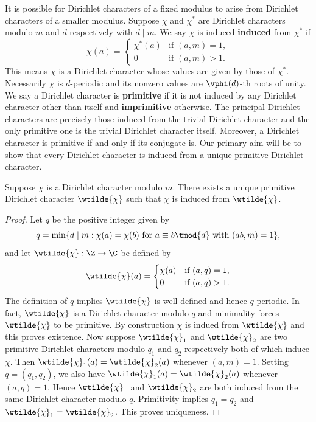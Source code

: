 \documentclass[12pt]{article}
\begin{document}
      It is possible for Dirichlet characters of a fixed modulus to arise from Dirichlet characters of a smaller modulus. Suppose \(\chi\) and \(\chi^{\ast}\) are Dirichlet characters modulo \(m\) and \(d\) respectively with \(d \mid m\). We say \(\chi\) is induced \textbf{induced} from \(\chi^{\ast}\) if
      \[
        \chi(a) = \begin{cases} \chi^{\ast}(a) & \text{if \((a,m) = 1\)}, \\ 0 & \text{if \((a,m) > 1\)}. \end{cases}
      \] 
      This means \(\chi\) is a Dirichlet character whose values are given by those of \(\chi^{\ast}\). Necessarily \(\chi\) is \(d\)-periodic and its nonzero values are \(\vphi(d)\)-th roots of unity. We say a Dirichlet character is \textbf{primitive} if it is not induced by any Dirichlet character other than itself and \textbf{imprimitive} otherwise. The principal Dirichlet characters are precisely those induced from the trivial Dirichlet character and the only primitive one is the trivial Dirichlet character itself. Moreover, a Dirichlet character is primitive if and only if its conjugate is. Our primary aim will be to show that every Dirichlet character is induced from a unique primitive Dirichlet character. 
      
      \begin{theorem}\label{thm:Dirichlet_character_conductor_existance}
        Suppose \(\chi\) is a Dirichlet character modulo \(m\). There exists a unique primitive Dirichlet character \(\wtilde{\chi}\) such that \(\chi\) is induced from \(\wtilde{\chi}\).
      \end{theorem}
      \begin{proof}
        Let \(q\) be the positive integer given by
        \[
          q = \min\{d \mid m:\chi(a) = \chi(b) \text{ for } a \equiv b \tmod{d} \text{ with } (ab,m) = 1\},
        \]
        and let \(\wtilde{\chi}:\Z \to \C\) be defined by
        \[
          \wtilde{\chi}(a) = \begin{cases} \chi(a) & \text{if \((a,q) = 1\)}, \\ 0 & \text{if \((a,q) > 1\)}. \end{cases}
        \]
        The definition of \(q\) implies \(\wtilde{\chi}\) is well-defined and hence \(q\)-periodic. In fact, \(\wtilde{\chi}\) is a Dirichlet character modulo \(q\) and minimality forces \(\wtilde{\chi}\) to be primitive. By construction \(\chi\) is indued from \(\wtilde{\chi}\) and this proves existence. Now suppose \(\wtilde{\chi}_{1}\) and \(\wtilde{\chi}_{2}\) are two primitive Dirichlet characters modulo \(q_{1}\) and \(q_{2}\) respectively both of which induce \(\chi\). Then \(\wtilde{\chi}_{1}(a) = \wtilde{\chi}_{2}(a)\) whenever \((a,m) = 1\). Setting \(q = (q_{1},q_{2})\), we also have \(\wtilde{\chi}_{1}(a) = \wtilde{\chi}_{2}(a)\) whenever \((a,q) = 1\). Hence \(\wtilde{\chi}_{1}\) and \(\wtilde{\chi}_{2}\) are both induced from the same Dirichlet character modulo \(q\). Primitivity implies \(q_{1} = q_{2}\) and \(\wtilde{\chi}_{1} = \wtilde{\chi}_{2}\). This proves uniqueness.
      \end{proof}
\end{document}
